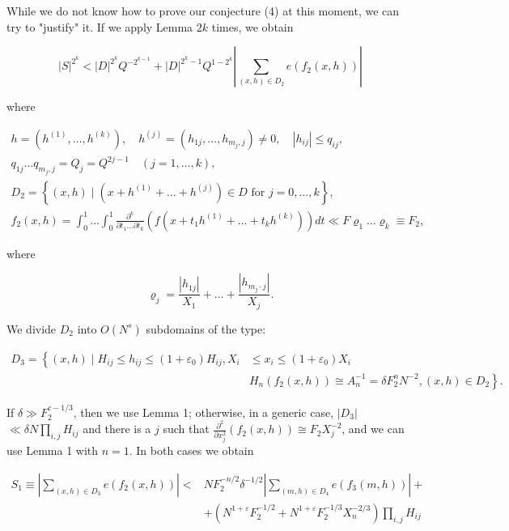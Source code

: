 \documentclass[10pt]{article}
\begin{document}
While we do not know how to prove our conjecture (4) at this moment, we can try to "justify" it. If we apply Lemma $2 k$ times, we obtain

$$
|S|^{2^{k}}<|D|^{2^{k}} Q^{-2^{k-1}}+|D|^{2^{k}-1} Q^{1-2^{k}}\left|\sum_{(x, h) \in D_{2}} e\left(f_{2}(x, h)\right)\right|
$$

where

$$
\begin{gathered}
h=\left(h^{(1)}, \ldots, h^{(k)}\right), \quad h^{(j)}=\left(h_{1 j}, \ldots, h_{m_{j}, j}\right) \neq 0, \quad\left|h_{i j}\right| \leqslant q_{i j}, \\
q_{1 j} \ldots q_{m_{j}, j}=Q_{j}=Q^{2 j-1} \quad(j=1, \ldots, k), \\
D_{2}=\left\{(x, h) \mid\left(x+h^{(1)}+\ldots+h^{(j)}\right) \in D \text { for } j=0, \ldots, k\right\}, \\
f_{2}(x, h)=\int_{0}^{1} \ldots \int_{0}^{1} \frac{\partial^{k}}{\partial t_{1} \ldots \partial t_{k}}\left(f\left(x+t_{1} h^{(1)}+\ldots+t_{k} h^{(k)}\right)\right) d t \ll F \varrho_{1} \ldots \varrho_{k} \equiv F_{2},
\end{gathered}
$$

where

$$
\varrho_{j}=\frac{\left|h_{1 j}\right|}{X_{1}}+\ldots+\frac{\left|h_{m_{j} \cdot j}\right|}{X_{j}} .
$$

We divide $D_{2}$ into $O\left(N^{s}\right)$ subdomains of the type:

$$
\begin{aligned}
D_{3}=\left\{(x, h) \mid H_{i j} \leqslant h_{i j} \leqslant\left(1+\varepsilon_{0}\right) H_{i j}, X_{i}\right. & \leqslant x_{i} \leqslant\left(1+\varepsilon_{0}\right) X_{i} \\
& \left.H_{n}\left(f_{2}(x, h)\right) \cong A_{n}^{-1}=\delta F_{2}^{n} N^{-2},(x, h) \in D_{2}\right\} .
\end{aligned}
$$

If $\delta \gg F_{2}^{c-1 / 3}$, then we use Lemma 1; otherwise, in a generic case, $\left|D_{3}\right|$ $\ll \delta N \prod_{i, j} H_{i j}$ and there is a $j$ such that $\frac{\partial^{2}}{\partial x_{j}^{2}}\left(f_{2}(x, h)\right) \cong F_{2} X_{j}^{-2}$, and we can use Lemma 1 with $n=1$. In both cases we obtain

$$
\begin{aligned}
S_{1} \equiv\left|\sum_{(x, h) \in D_{3}} e\left(f_{2}(x, h)\right)\right|< & N F_{2}^{-n / 2} \delta^{-1 / 2}\left|\sum_{(m, h) \in D_{4}} e\left(f_{3}(m, h)\right)\right|+ \\
& +\left(N^{1+\varepsilon} F_{2}^{-1 / 2}+N^{1+\varepsilon} F_{2}^{-1 / 3} X_{n}^{-2 / 3}\right) \prod_{i, j} H_{i j}
\end{aligned}
$$
\end{document}
